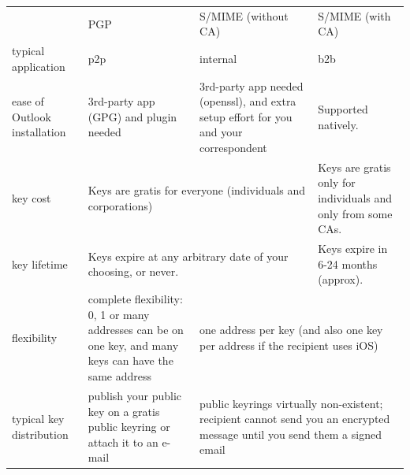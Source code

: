 \documentclass[pdftex,12pt,titlepage=false]{scrartcl}
\begin{document}
\begin{appendices}
\begin{minipage}{\textwidth}
    \begin{tabular}{p{}|p{}|p{}|p{}}
      & PGP & S/MIME \newline\small(without CA) & S/MIME \newline\small(with CA)\\
      typical application & p2p & internal & b2b\\
      ease of Outlook installation
      & 3rd-party app (GPG) and plugin needed
            & 3rd-party app needed (openssl), and extra setup effort for you and your correspondent
                                                & Supported natively.\\
      key cost
      & \multicolumn{2}{D}{Keys are gratis for everyone (individuals and corporations)}
            & Keys are gratis only for individuals and only from some CAs.\\
      key lifetime
      & \multicolumn{2}{D}{Keys expire at any arbitrary date of your choosing, or never.}
            & Keys expire in 6-24 months (approx).\\
      flexibility
      & complete flexibility: 0, 1 or many addresses can be on one key, and many keys can have the same address
            & \multicolumn{2}{S}{one address per key (and also one key per address if the recipient uses iOS)}\\
      typical key distribution
      & publish your public key on a gratis public keyring or attach it to an e-mail
            & \multicolumn{2}{S}{public keyrings virtually non-existent; recipient cannot send you an encrypted message until you send them a signed email}\\
    \end{tabular}
  \end{minipage}
\end{appendices}
\end{document}
